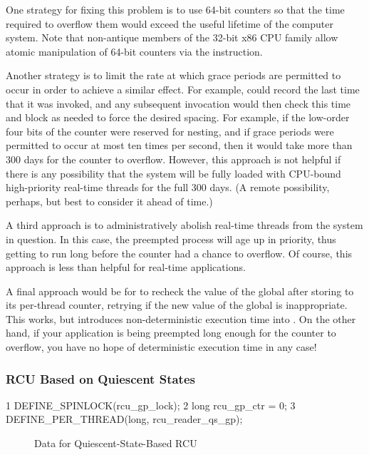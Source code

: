 {	One strategy for fixing this problem is to use 64-bit
	counters so that the time required to overflow them would exceed
	the useful lifetime of the computer system.
	Note that non-antique members of the 32-bit x86 CPU family
	allow atomic manipulation of 64-bit counters via the
	 instruction.

	Another strategy is to limit the rate at which grace periods are
	permitted to occur in order to achieve a similar effect.
	For example,  could record the last time
	that it was invoked, and any subsequent invocation would then
	check this time and block as needed to force the desired
	spacing.
	For example, if the low-order four bits of the counter were
	reserved for nesting, and if grace periods were permitted to
	occur at most ten times per second, then it would take more
	than 300 days for the counter to overflow.
	However, this approach is not helpful if there is any possibility
	that the system will be fully loaded with CPU-bound high-priority
	real-time threads for the full 300 days.
	(A remote possibility, perhaps, but best to consider it ahead
	of time.)

	A third approach is to administratively abolish real-time threads
	from the system in question.
	In this case, the preempted process will age up in priority,
	thus getting to run long before the counter had a chance to
	overflow.
	Of course, this approach is less than helpful for real-time
	applications.

	A final approach would be for  to recheck
	the value of the global  after storing to its
	per-thread  counter, retrying if the new
	value of the global  is inappropriate.
	This works, but introduces non-deterministic execution time
	into .
	On the other hand, if your application is being preempted long
	enough for the counter to overflow, you have no hope of
	deterministic execution time in any case!
} \QuickQuizEnd

\subsubsection{RCU Based on Quiescent States}
\label{defer:RCU Based on Quiescent States}

{ \scriptsize
\begin{verbbox}
  1 DEFINE_SPINLOCK(rcu_gp_lock);
  2 long rcu_gp_ctr = 0;
  3 DEFINE_PER_THREAD(long, rcu_reader_qs_gp);
\end{verbbox}
}
\begin{figure}[tbp]
\centering
\theverbbox
\caption{Data for Quiescent-State-Based RCU}
\label{fig:defer:Data for Quiescent-State-Based RCU}
\end{figure}

